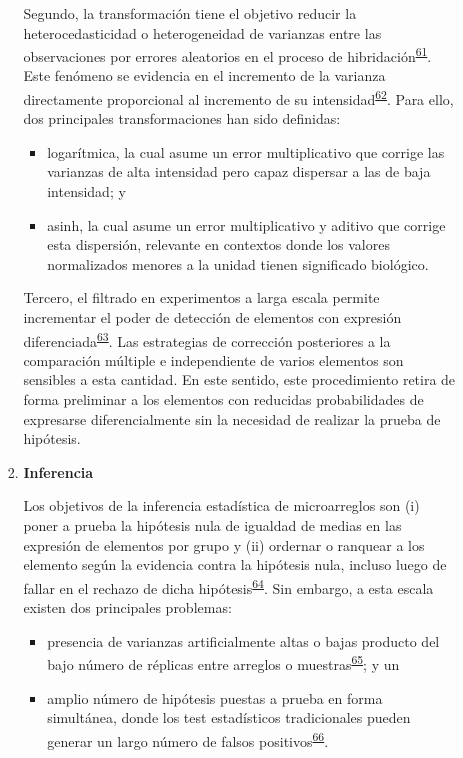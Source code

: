 \documentclass[]{article}
\providecommand{\tightlist}{%
  \setlength{\itemsep}{0pt}\setlength{\parskip}{0pt}}
\begin{document}
\begin{enumerate}
\begin{enumerate}
\begin{enumerate}
      Segundo, la transformación tiene el objetivo reducir la
      heterocedasticidad o heterogeneidad de varianzas entre las
      observaciones por errores aleatorios en el proceso de
      hibridación\textsuperscript{\protect\hyperlink{ref-kreil2005bullet}{61}}.
      Este fenómeno se evidencia en el incremento de la varianza
      directamente proporcional al incremento de su
      intensidad\textsuperscript{\protect\hyperlink{ref-brown2001image}{62}}.
      Para ello, dos principales transformaciones han sido definidas:

      \begin{itemize}
      \tightlist
      \item
        logarítmica, la cual asume un error multiplicativo que corrige
        las varianzas de alta intensidad pero capaz dispersar a las de
        baja intensidad; y
      \item
        asinh, la cual asume un error multiplicativo y aditivo que
        corrige esta dispersión, relevante en contextos donde los
        valores normalizados menores a la unidad tienen significado
        biológico.
      \end{itemize}

      Tercero, el filtrado en experimentos a larga escala permite
      incrementar el poder de detección de elementos con expresión
      diferenciada\textsuperscript{\protect\hyperlink{ref-bourgon2010filter}{63}}.
      Las estrategias de corrección posteriores a la comparación
      múltiple e independiente de varios elementos son sensibles a esta
      cantidad. En este sentido, este procedimiento retira de forma
      preliminar a los elementos con reducidas probabilidades de
      expresarse diferencialmente sin la necesidad de realizar la prueba
      de hipótesis.
    \item
      \textbf{Inferencia}

      Los objetivos de la inferencia estadística de microarreglos son
      (i) poner a prueba la hipótesis nula de igualdad de medias en las
      expresión de elementos por grupo y (ii) ordernar o ranquear a los
      elemento según la evidencia contra la hipótesis nula, incluso
      luego de fallar en el rechazo de dicha
      hipótesis\textsuperscript{\protect\hyperlink{ref-smyth2004ebayes}{64}}.
      Sin embargo, a esta escala existen dos principales problemas:

      \begin{itemize}
      \tightlist
      \item
        presencia de varianzas artificialmente altas o bajas producto
        del bajo número de réplicas entre arreglos o
        muestras\textsuperscript{\protect\hyperlink{ref-baldi2001cybert}{65}};
        y un
      \item
        amplio número de hipótesis puestas a prueba en forma simultánea,
        donde los test estadísticos tradicionales pueden generar un
        largo número de falsos
        positivos\textsuperscript{\protect\hyperlink{ref-kayala2012cyber}{66}}.
      \end{itemize}


\end{enumerate}
\end{enumerate}
\end{enumerate}
\end{document}
